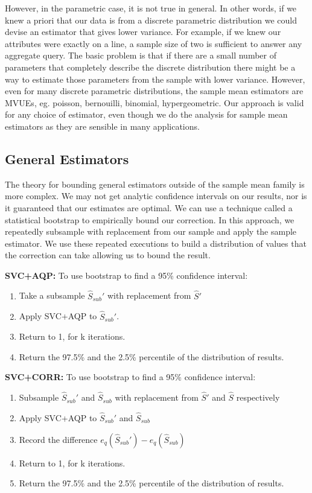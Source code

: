 However, in the parametric case, it is not true in general.
In other words, if we knew a priori that our data is from a discrete parametric distribution we could devise
an estimator that gives lower variance.
For example, if we knew our attributes were exactly on a line, a sample size of two is sufficient to answer any aggregate query.
The basic problem is that if there are a small number of parameters that completely describe the discrete distribution there might be 
a way to estimate those parameters from the sample with lower variance.
However, even for many discrete parametric distributions, the sample mean estimators are MVUEs, eg. poisson, bernouilli, binomial, hypergeometric.
Our approach is valid for any choice of estimator, even though we do the analysis for sample mean estimators as they are sensible in many applications.

\subsection{General Estimators}
The theory for bounding general estimators outside of the sample mean family is more complex.
We may not get analytic confidence intervals on our results, nor is it guaranteed that our estimates are optimal.
We can use a technique called a statistical bootstrap \cite{AgarwalMPMMS13} to empirically bound our correction.
In this approach, we repeatedly subsample with replacement from our sample and apply the sample estimator.
We use these repeated executions to build a distribution of values that the correction can take allowing us to bound the result.

\noindent\textbf{SVC+AQP: } To use bootstrap to find a 95\% confidence interval:
\begin{enumerate}[noitemsep]
\item Take a subsample $\widehat{S}_{sub}'$ with replacement from $\widehat{S}'$
\item Apply SVC+AQP to $\widehat{S}_{sub}'$.
\item Return to 1, for k iterations.
\item Return the 97.5\% and the 2.5\% percentile of the distribution of results.
\end{enumerate}

\noindent\textbf{SVC+CORR: } To use bootstrap to find a 95\% confidence interval:
\begin{enumerate}[noitemsep]
\item Subsample $\widehat{S}_{sub}'$ and $\widehat{S}_{sub}$ with replacement from $\widehat{S}'$ and $\widehat{S}$ respectively
\item Apply SVC+AQP to $\widehat{S}_{sub}'$ and $\widehat{S}_{sub}$
\item Record the difference $e_q(\widehat{S}_{sub}')-e_q(\widehat{S}_{sub})$
\item Return to 1, for k iterations.
\item Return the 97.5\% and the 2.5\% percentile of the distribution of results.
\end{enumerate}

